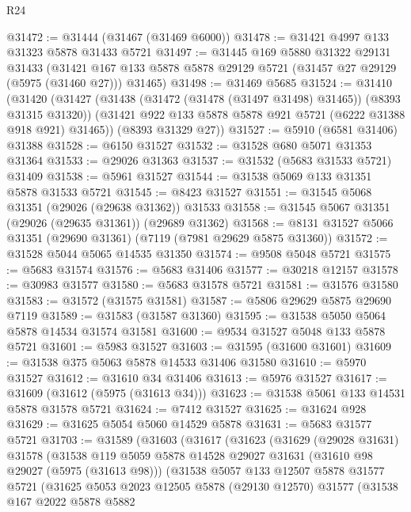 \begin{lexlean}{R24}
\begin{coremodule}
@31472 := @31444 (@31467 (@31469 @6000))
@31478 := @31421 @4997 @133 @31323 @5878 @31433 @5721
@31497 := @31445
    @169
    @5880
    @31322
    @29131
    @31433
    (@31421 @167 @133 @5878 @5878 @29129 @5721 (@31457 @27 @29129 (@5975 (@31460 @27))) @31465)
@31498 := @31469 @5685
@31524 := @31410
    (@31420
      (@31427
        (@31438 (@31472 (@31478 (@31497 @31498) @31465)) (@8393 @31315 @31320))
        (@31421 @922 @133 @5878 @5878 @921 @5721 (@6222 @31388 @918 @921) @31465))
      (@8393 @31329 @27))
@31527 := @5910 (@6581 @31406) @31388
@31528 := @6150 @31527
@31532 := @31528 @680 @5071 @31353 @31364
@31533 := @29026 @31363
@31537 := @31532 (@5683 @31533 @5721) @31409
@31538 := @5961 @31527
@31544 := @31538 @5069 @133 @31351 @5878 @31533 @5721
@31545 := @8423 @31527
@31551 := @31545 @5068 @31351 (@29026 (@29638 @31362)) @31533
@31558 := @31545 @5067 @31351 (@29026 (@29635 @31361)) (@29689 @31362)
@31568 := @8131 @31527 @5066 @31351 (@29690 @31361) (@7119 (@7981 @29629 @5875 @31360))
@31572 := @31528 @5044 @5065 @14535 @31350
@31574 := @9508 @5048 @5721
@31575 := @5683 @31574
@31576 := @5683 @31406
@31577 := @30218 @12157
@31578 := @30983 @31577
@31580 := @5683 @31578 @5721
@31581 := @31576 @31580
@31583 := @31572 (@31575 @31581)
@31587 := @5806 @29629 @5875 @29690 @7119
@31589 := @31583 (@31587 @31360)
@31595 := @31538 @5050 @5064 @5878 @14534 @31574 @31581
@31600 := @9534 @31527 @5048 @133 @5878 @5721
@31601 := @5983 @31527
@31603 := @31595 (@31600 @31601)
@31609 := @31538 @375 @5063 @5878 @14533 @31406 @31580
@31610 := @5970 @31527
@31612 := @31610 @34 @31406
@31613 := @5976 @31527
@31617 := @31609 (@31612 (@5975 (@31613 @34)))
@31623 := @31538 @5061 @133 @14531 @5878 @31578 @5721
@31624 := @7412 @31527
@31625 := @31624 @928
@31629 := @31625 @5054 @5060 @14529 @5878
@31631 := @5683 @31577 @5721
@31703 := @31589
    (@31603
      (@31617
        (@31623
          (@31629
            (@29028 @31631)
            @31578
            (@31538
              @119
              @5059
              @5878
              @14528
              @29027
              @31631
              (@31610 @98 @29027 (@5975 (@31613 @98)))
              (@31538
                @5057
                @133
                @12507
                @5878
                @31577
                @5721
                (@31625
                  @5053
                  @2023
                  @12505
                  @5878
                  (@29130 @12570)
                  @31577
                  (@31538
                    @167
                    @2022
                    @5878
                    @5882

\end{coremodule}
\end{lexlean}
